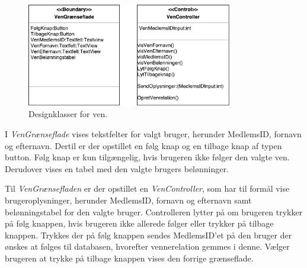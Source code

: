 \begin{figure} [H]
\centering
\includegraphics[width=0.8\textwidth]{figures/MVC/MVCVen}
\caption{Designklasser for ven.}
\label{fig:MVCVen}
\end{figure}

\noindent
I \textit{VenGrænseflade} vises tekstfelter for valgt bruger, herunder MedlemsID, fornavn og efternavn. Dertil er der opstillet en følg knap og en tilbage knap af typen button. Følg knap er kun tilgængelig, hvis brugeren ikke følger den valgte ven. Derudover vises en tabel med den valgte brugers belønninger.


Til \textit{VenGrænsefladen} er der opstillet en \textit{VenController}, som har til formål vise brugeroplysninger, herunder MedlemsID, fornavn og efternavn samt belønningstabel for den valgte bruger. Controlleren lytter på om brugeren trykker på følg knappen, hvis brugeren ikke allerede følger eller trykker på tilbage knappen. Trykkes der på følg knappen sendes MedlemsID'et på den bruger der ønskes at følges til databasen, hvorefter vennerelation gemmes i denne. Vælger brugeren at trykke på tilbage knappen vises den forrige grænseflade.   